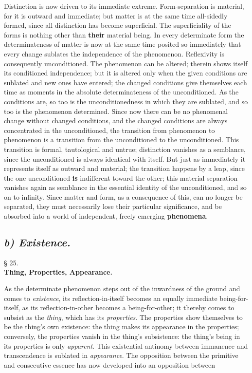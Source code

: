 \documentclass[12pt,a4paper,openany]{book}
\newcommand{\opage}[1]{\marginnote{\footnotesize\textit{[#1]}}}
\newcommand{\underafsnit}[1]{\subsection*{\centering\emph{#1}}\addcontentsline{toc}{subsection}{#1}}
\newcommand{\paragraf}[2]{\begin{center}§ #1.\\[0.2em]\textbf{#2}\end{center}}
\begin{document}
Distinction is now driven to its immediate extreme.
Form-separation is material, for it is outward
and immediate; but matter is at the same time all-sidedly
formed, since all distinction has become superficial.
The superficiality of the forms is nothing other than
\textbf{their} material being. In every determinate form
the determinateness of matter is now at the same time posited so immediately
that every change sublates the independence of the phenomenon.
Reflexivity is consequently unconditioned.
The phenomenon can be altered; therein shows itself its
conditioned independence; but it is altered only
when the given conditions are sublated and new ones have entered;
the changed conditions give themselves each
time as moments in the absolute determinateness of the unconditioned.
As the conditions are, so too is the
unconditionedness in which they are sublated, and so too is
the phenomenon determined. Since now there can be
no phenomenal change without changed conditions,
and the changed conditions are always concentrated
in the unconditioned, the transition from phenomenon
to phenomenon is a transition from the unconditioned
to the unconditioned. This transition is formal,
tautological and untrue; distinction vanishes as
a semblance, since the unconditioned is always identical with
itself. But just as immediately it represents
itself as outward and material; the transition happens by
\setcounter{footnote}{0}%
\opage{157}a leap, since the one unconditioned \textbf{is} indifferent
toward the other; this material separation vanishes
again as semblance in the essential identity of the unconditioned, and so on to infinity. Since
matter and form, as a consequence of this, can no longer
be separated, they must necessarily lose their
particular significance, and be absorbed into a world of independent, freely emerging \textbf{phenomena}.

\underafsnit{b) Existence.}
\paragraf{25}{Thing, Properties, Appearance.}

As the determinate phenomenon steps out of the inwardness of the ground and comes to \emph{existence}, its reflection-in-itself becomes an equally immediate being-for-itself,
as its reflection-in-other becomes a being-for-other; it thereby comes to subsist as the \emph{thing}, which has its \emph{properties}. The properties
show themselves to be the thing's own existence: the thing
makes its appearance in the properties; conversely, the properties vanish
in the thing's subsistence: the thing's being in its properties is only \emph{apparent}. This existential antinomy between immanence and
transcendence is sublated in \emph{appearance}. The opposition between the primitive and consecutive
essence has now developed into an opposition between
\end{document}
